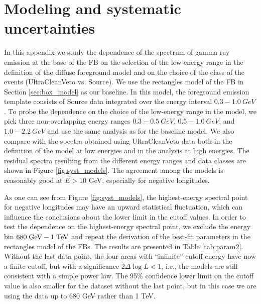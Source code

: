 \section{Modeling and systematic uncertainties}

In this appendix we study the dependence of the spectrum of gamma-ray emission at the base of the FB
on the selection of the low-energy range in the definition of the diffuse foreground model
and on the choice of the class of the events (UltraCleanVeto vs. Source).
We use the rectangles model of the FB in Section \ref{sec:box_model}
as our baseline.
In this model, the foreground emission template consists of Source data integrated over the energy interval $0.3 - \SI{1.0}{GeV}$. 
To probe the dependence on the choice of the low-energy range in the model, 
we pick three non-overlapping energy ranges $0.3 - \SI{0.5}{GeV}$, $0.5 - \SI{1.0}{GeV}$, and $1.0 - \SI{2.2}{GeV}$ 
and use the same analysis as for the baseline model. 
We also compare with the spectra obtained using UltraCleanVeto data both in the definition of the model
at low energies and in the analysis at high energies.
The residual spectra resulting from the different energy ranges and data classes are shown in Figure \ref{fig:syst_models}. 
The agreement among the models is reasonably good at $E > 10$ GeV, especially for negative longitudes.

As one can see from Figure \ref{fig:syst_models}, 
the highest-energy spectral point for negative longitudes may have an upward statistical fluctuation,
which can influence the conclusions about the lower limit in the cutoff values.
In order to test the dependence on the highest-energy spectral point, we exclude the energy bin $680\;{\rm GeV} - 1\;{\rm TeV}$ and 
repeat the derivation of the best-fit parameters in the rectangles model of the FBs.
The results are presented in Table \ref{tab:param2}.
Without the last data point, the four areas with ``infinite'' cutoff energy have now a finite cutoff,
but with a significance $2\Delta \log L  < 1$, i.e., the models are still consistent with a simple power law.
The 95\% confidence lower limit on the cutoff value is also smaller for the dataset without the last point,
but in this case we are using the data up to 680 GeV rather than 1 TeV.

